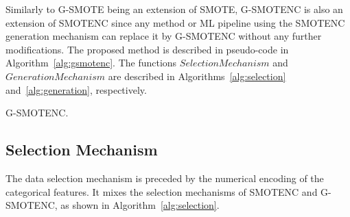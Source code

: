 \documentclass[parskip=full]{scrartcl}
\begin{document}
Similarly to G-SMOTE being an extension of SMOTE, G-SMOTENC is also an
extension of SMOTENC since any method or ML pipeline using the SMOTENC
generation mechanism can replace it by G-SMOTENC without any further
modifications. The proposed method is described in pseudo-code in
Algorithm~\ref{alg:gsmotenc}. The functions $SelectionMechanism$ and
$GenerationMechanism$ are described in Algorithms~\ref{alg:selection}
and~\ref{alg:generation}, respectively.

\begin{algorithm}
    \caption{G-SMOTENC.}\label{alg:gsmotenc}
    \DontPrintSemicolon%
    

\end{algorithm}

\subsection{Selection Mechanism}

The data selection mechanism is preceded by the numerical encoding of the
categorical features. It mixes the selection mechanisms of SMOTENC and
G-SMOTENC, as shown in Algorithm~\ref{alg:selection}.
\end{document}
